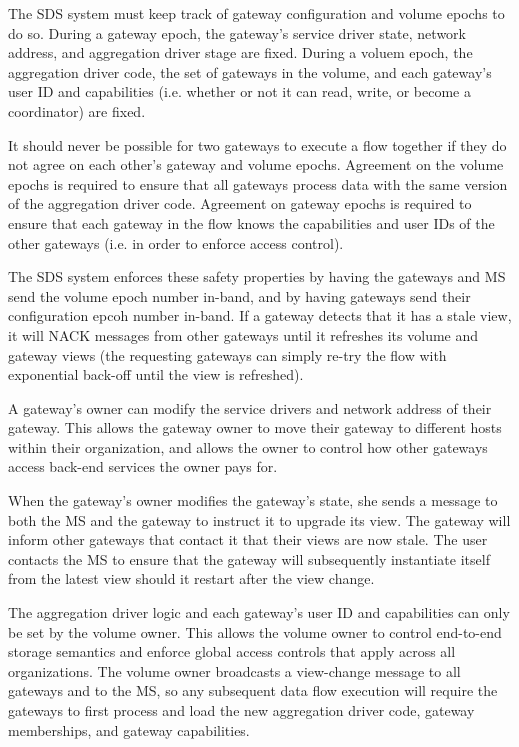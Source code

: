 The SDS system must keep track of gateway configuration and volume 
epochs to do so.  During a gateway epoch, the gateway's service
driver state, network address, and aggregation driver stage are fixed.  During
a voluem epoch, the aggregation driver code, the set of gateways in the
volume, and each gateway's user ID and capabilities (i.e. whether or not it can
read, write, or become a coordinator) are fixed.

It should never be possible for two gateways to execute a flow together if they
do not agree on each other's gateway and volume epochs.  Agreement on the volume
epochs is required to ensure that all gateways process data with the same version
of the aggregation driver code.  Agreement on gateway epochs is required to
ensure that each gateway in the flow knows the capabilities and user IDs of the
other gateways (i.e. in order to enforce access control).

The SDS system enforces these safety properties by having the gateways and MS
send the volume epoch number in-band, and by having gateways send their
configuration epcoh number in-band.  If a gateway detects that it has a stale
view, it will NACK messages from other gateways until it refreshes its volume
and gateway views (the requesting gateways can simply re-try the flow with
exponential back-off until the view is refreshed).

A gateway's owner can modify the service drivers and network address of their
gateway.  This allows the gateway owner to move their gateway to different hosts
within their organization, and allows the owner to control how other gateways
access back-end services the owner pays for.

When the gateway's owner modifies the gateway's state, she sends a message to
both the MS and the gateway to instruct it to upgrade its view.
The gateway will inform other gateways that contact it that their views are now
stale.  The user contacts the MS to ensure that the gateway will subsequently
instantiate itself from the latest view should it restart after the view change.

The aggregation driver logic and each gateway's user ID and capabilities
can only be set by the volume owner.  This allows the volume owner to control
end-to-end storage semantics and enforce global access controls that apply
across all organizations.  The volume owner broadcasts a view-change message to
all gateways and to the MS, so any subsequent data flow execution will require
the gateways to first process and load the new aggregation driver code, gateway
memberships, and gateway capabilities.

